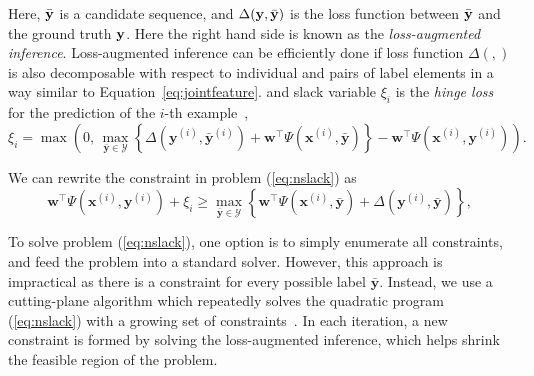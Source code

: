 
Here, $\bar{\mathbf{y}}$ is a candidate sequence,  %
and $\Delta(\mathbf{y}, \bar{\mathbf{y}})$ is the loss function between $\bar{\mathbf{y}}$ and the ground truth $\mathbf{y}$. 
Here the right hand side is known as the \emph{loss-augmented inference}. 
Loss-augmented inference can be efficiently done if loss function $\Delta(,)$ is also decomposable 
with respect to individual and pairs of label elements in a way similar to Equation~\eqref{eq:jointfeature}.
and slack variable $\xi_i$ is the \emph{hinge loss} for the prediction of the $i$-th example~\cite{tsochantaridis2005large},
\begin{equation*}
\xi_i = \max \left( 0, \,
       \max_{\bar{\mathbf{y}} \in \mathcal{Y}} 
       \left\{ \Delta(\mathbf{y}^{(i)}, \bar{\mathbf{y}}^{(i)}) + \mathbf{w}^\top \Psi(\mathbf{x}^{(i)}, \bar{\mathbf{y}}) \right\} -
       \mathbf{w}^\top \Psi(\mathbf{x}^{(i)}, \mathbf{y}^{(i)}) \right).
\end{equation*}

We can rewrite the constraint in problem (\ref{eq:nslack}) as
\begin{equation}
\label{eq:ssvminf}
\mathbf{w}^\top \Psi(\mathbf{x}^{(i)}, \mathbf{y}^{(i)}) + \xi_i \ge
          \max_{\bar{\mathbf{y}} \in \mathcal{Y}}
          \left\{\mathbf{w}^\top \Psi(\mathbf{x}^{(i)}, \bar{\mathbf{y}}) + \Delta(\mathbf{y}^{(i)}, \bar{\mathbf{y}}) \right\},
\end{equation}


To solve problem (\ref{eq:nslack}), one option is to simply enumerate all constraints, and feed the problem into a standard solver.
However, this approach is impractical as there is a constraint for every possible label $\bar{\mathbf{y}}$.
Instead, we use a cutting-plane algorithm which repeatedly solves the quadratic program (\ref{eq:nslack}) 
with a growing set of constraints~\cite{joachims2009predicting}.
In each iteration, a new constraint is formed by solving the loss-augmented inference, 
which helps shrink the feasible region of the problem.



